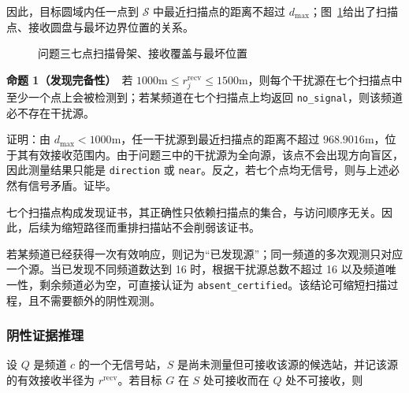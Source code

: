因此，目标圆域内任一点到 $\mathcal S$ 中最近扫描点的距离不超过 $d_{\max}$；图~\ref{fig:q3_scan_certificate}给出了扫描点、接收圆盘与最坏边界位置的关系。

\begin{figure}[htbp]
\centering
{}
\caption{问题三七点扫描骨架、接收覆盖与最坏位置}
\label{fig:q3_scan_certificate}
\end{figure}

\textbf{命题 1（发现完备性）}　若 $1000\mathrm{m}\le r_j^{\mathrm{recv}}\le1500\mathrm{m}$，则每个干扰源在七个扫描点中至少一个点上会被检测到；若某频道在七个扫描点上均返回 \texttt{no\_signal}，则该频道必不存在干扰源。

证明：由 $d_{\max}<1000\mathrm{m}$，任一干扰源到最近扫描点的距离不超过 $968.9016\mathrm{m}$，位于其有效接收范围内。由于问题三中的干扰源为全向源，该点不会出现方向盲区，因此测量结果只能是 \texttt{direction} 或 \texttt{near}。反之，若七个点均无信号，则与上述必然有信号矛盾。证毕。\par\vspace{1em}

七个扫描点构成发现证书，其正确性只依赖扫描点的集合，与访问顺序无关。因此，后续为缩短路径而重排扫描站不会削弱该证书。

若某频道已经获得一次有效响应，则记为“已发现源”；同一频道的多次观测只对应一个源。当已发现不同频道数达到 16 时，根据干扰源总数不超过 16 以及频道唯一性，剩余频道必为空，可直接认证为 \texttt{absent\_certified}。该结论可缩短扫描过程，且不需要额外的阴性观测。

\subsubsection{阴性证据推理}

设 $Q$ 是频道 $c$ 的一个无信号站，$S$ 是尚未测量但可接收该源的候选站，并记该源的有效接收半径为 $r^{\mathrm{recv}}$。若目标 $G$ 在 $S$ 处可接收而在 $Q$ 处不可接收，则


